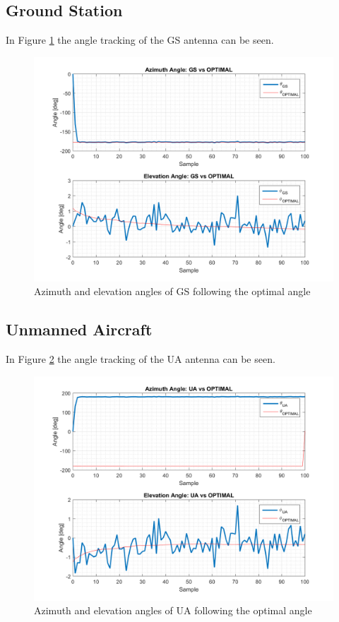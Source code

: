 \subsection{Ground Station}
In Figure \ref{fig:s2_gs} the angle tracking of the GS antenna can be seen.

\begin{figure}[H]
	\centering
	\includegraphics[scale=0.75]{figures/s2_gs.png}
	\caption{Azimuth and elevation angles of GS following the optimal angle}
	\label{fig:s2_gs}
\end{figure}

\subsection{Unmanned Aircraft}
In Figure \ref{fig:s2_ua} the angle tracking of the UA antenna can be seen.

\begin{figure}[H]
	\centering
	\includegraphics[scale=0.75]{figures/s2_ua.png}
	\caption{Azimuth and elevation angles of UA following the optimal angle}
	\label{fig:s2_ua}
\end{figure}


